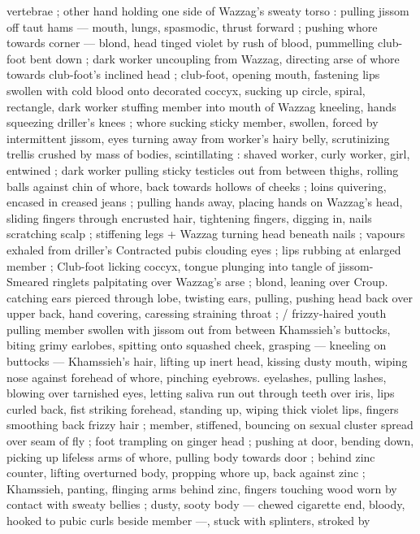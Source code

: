 vertebrae ; other hand holding one side of Wazzag's sweaty torso : 
pulling jissom off taut hams --- mouth, lungs, spasmodic, thrust 
forward ; pushing whore towards corner --- blond, head tinged violet 
by rush of blood, pummelling club-foot bent down ; dark worker 
uncoupling from Wazzag, directing arse of whore towards club-foot's 
inclined head ; club-foot, opening mouth, fastening lips swollen with 
cold blood onto decorated coccyx, sucking up circle, spiral, 
rectangle, dark worker stuffing member into mouth of Wazzag 
kneeling, hands squeezing driller's knees ; whore sucking sticky 
member, swollen, forced by intermittent jissom, eyes turning away 
from worker's hairy belly, scrutinizing trellis crushed by mass of 
bodies, scintillating : shaved worker, curly worker, girl, entwined ; 
dark worker pulling sticky testicles out from between thighs, rolling 
balls against chin of whore, back towards hollows of cheeks ; loins 
quivering, encased in creased jeans ; pulling hands away, placing 
hands on Wazzag's head, sliding fingers through encrusted hair, 
tightening fingers, digging in, nails scratching scalp ; stiffening legs 
+ Wazzag turning head beneath nails ; vapours exhaled from driller's 
Contracted pubis clouding eyes ; lips rubbing at enlarged member ; 
Club-foot licking coccyx, tongue plunging into tangle of jissom- 
Smeared ringlets palpitating over Wazzag's arse ; blond, leaning over 
Croup. catching ears pierced through lobe, twisting ears, pulling, 
pushing head back over upper back, hand covering, caressing 
straining throat ; {\slash} frizzy-haired youth pulling member swollen with 
jissom out from between Khamssieh's buttocks, biting grimy 
earlobes, spitting onto squashed cheek, grasping --- kneeling on 
buttocks --- Khamssieh's hair, lifting up inert head, kissing dusty 
mouth, wiping nose against forehead of whore, pinching eyebrows. 
eyelashes, pulling lashes, blowing over tarnished eyes, letting saliva 
run out through teeth over iris, lips curled back, fist striking 
forehead, standing up, wiping thick violet lips, fingers smoothing 
back frizzy hair ; member, stiffened, bouncing on sexual cluster 
spread over seam of fly ; foot trampling on ginger head ; pushing at 
door, bending down, picking up lifeless arms of whore, pulling body 
towards door ; behind zinc counter, lifting overturned body, propping 
whore up, back against zinc ; Khamssieh, panting, flinging arms 
behind zinc, fingers touching wood worn by contact with sweaty 
bellies ; dusty, sooty body --- chewed cigarette end, bloody, hooked 
to pubic curls beside member ---, stuck with splinters, stroked by 
